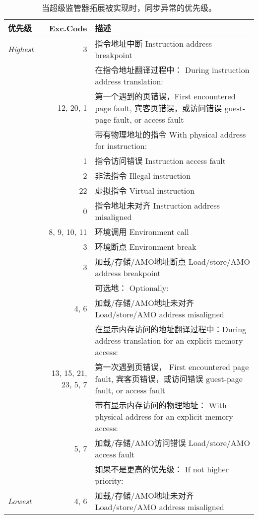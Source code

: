\begin{table*}[htbp]
\begin{center}
\begin{tabular}{|l|r|l|}
  \hline
  优先级      & Exc.\@ Code  & 描述 \\
  \hline
  {\em Highest} &            3 & 指令地址中断  Instruction address breakpoint \\
  \hline
                &              & 在指令地址翻译过程中： During instruction address translation: \\
                &    12, 20, 1 & \quad 第一个遇到的页错误，First encountered page fault,
                                     宾客页错误，或访问错误   guest-page fault, or access fault \\
  \hline
                &              & 带有物理地址的指令  With physical address for instruction: \\
                &            1 & \quad 指令访问错误 Instruction access fault \\
  \hline
                &            2 & 非法指令  Illegal instruction \\
                &           22 & 虚拟指令  Virtual instruction \\
                &            0 & 指令地址未对齐 Instruction address misaligned \\
                & 8, 9, 10, 11 & 环境调用  Environment call \\
                &            3 & 环境断点  Environment break \\
                &            3 & 加载/存储/AMO地址断点 Load/store/AMO address breakpoint \\
  \hline
                &              & 可选地：   Optionally: \\
                &         4, 6 & \quad 加载/存储/AMO地址未对齐  Load/store/AMO address misaligned \\
  \hline
                &              & 在显示内存访问的地址翻译过程中：During address translation for an explicit
                                   memory access: \\
        & 13, 15, 21, 23, 5, 7 & \quad 第一次遇到页错误， First encountered page fault,
                                   宾客页错误，或访问错误  guest-page fault, or access fault \\
  \hline
                &              & 带有显示内存访问的物理地址： With physical address for an explicit
                                   memory access: \\
                &         5, 7 & \quad 加载/存储/AMO访问错误  Load/store/AMO access fault \\
  \hline
                &              & 如果不是更高的优先级： If not higher priority: \\
  {\em Lowest}  &         4, 6 & \quad 加载/存储/AMO地址未对齐 Load/store/AMO address misaligned \\
  \hline
\end{tabular}
\end{center}
\caption{当超级监管器拓展被实现时，同步异常的优先级。
}
\label{tab:HSyncExcPrio}
\end{table*}

